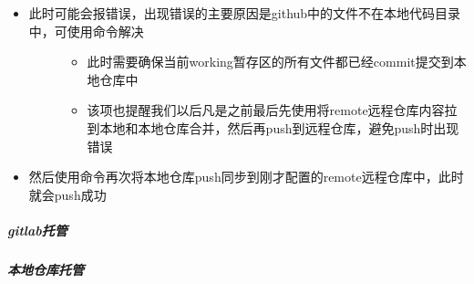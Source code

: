\documentclass[a4paper,10pt,english]{sphinxmanual}
\begin{document}
\begin{figure}[htbp]
\centering

\noindent{}
\end{figure}
\begin{itemize}
\item {} \begin{description}
\item[{此时可能会报错误，出现错误的主要原因是github中的文件不在本地代码目录中，可使用命令解决}] \leavevmode\begin{itemize}
\item {} 
此时需要确保当前working暂存区的所有文件都已经commit提交到本地仓库中

\item {} 
该项也提醒我们以后凡是之前最后先使用将remote远程仓库内容拉到本地和本地仓库合并，然后再push到远程仓库，避免push时出现错误

\end{itemize}

\end{description}

\end{itemize}

\begin{figure}[htbp]
\centering

\noindent{}
\end{figure}
\begin{itemize}
\item {} 
然后使用命令再次将本地仓库push同步到刚才配置的remote远程仓库中，此时就会push成功

\end{itemize}

\begin{figure}[htbp]
\centering

\noindent{}
\end{figure}


\subparagraph{gitlab托管}
\label{\detokenize{sphinx/2-collocation/2-gitlab/index:gitlab}}\label{\detokenize{sphinx/2-collocation/2-gitlab/index::doc}}

\subparagraph{本地仓库托管}
\label{\detokenize{sphinx/2-collocation/3-local/index::doc}}\label{\detokenize{sphinx/2-collocation/3-local/index:id1}}
\end{document}
